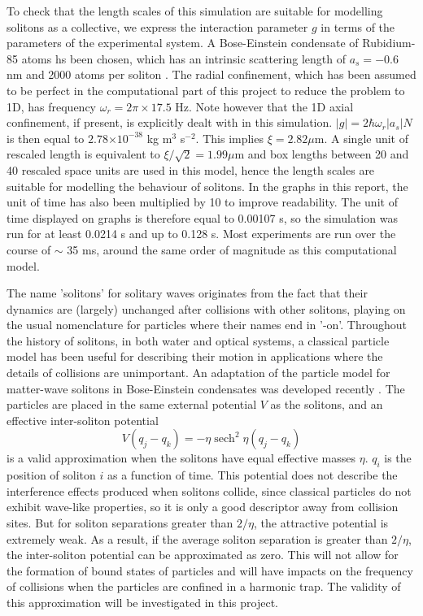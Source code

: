 \documentclass[10pt, twocolumn]{revtex4}    %
\DeclareMathOperator{\sech}{sech}		%
\providecommand{\e}[1]{\ensuremath{\times 10^{#1}}} %
\begin{document}
To check that the length scales of this simulation are suitable for modelling solitons as a collective, we express the interaction parameter $g$ in terms of the parameters of the experimental system. A Bose-Einstein condensate of Rubidium-85 atoms hs been chosen, which has an intrinsic scattering length of $a_s = -0.6$ nm and 2000 atoms per soliton \cite{ExpParams}. The radial confinement, which has been assumed to be perfect in the computational part of this project to reduce the problem to 1D, has frequency $\omega_r = 2\pi \times 17.5$ Hz. Note however that the 1D axial confinement, if present, is explicitly dealt with in this simulation. $|g| = 2\hbar \omega_r |a_s| N$ \cite{Cornish} is then equal to $2.78 \e{-38}$ kg m$^3$ s$^{-2}$. This implies $\xi = 2.82 \mu$m. A single unit of rescaled length is equivalent to $\xi/\sqrt{2} = 1.99 \mu$m and box lengths between 20 and 40 rescaled space units are used in this model, hence the length scales are suitable for modelling the behaviour of solitons. In the graphs in this report, the unit of time has also been multiplied by 10 to improve readability. The unit of time displayed on graphs is therefore equal to 0.00107 s, so the simulation was run for at least 0.0214 s and up to 0.128 s. Most experiments are run over the course of $\sim$ 35 ms, around the same order of magnitude as this computational model. 

The name 'solitons' for solitary waves originates from the fact that their dynamics are (largely) unchanged after collisions with other solitons, playing on the usual nomenclature for particles where their names end in '-on'. Throughout the history of solitons, in both water and optical systems, a classical particle model has been useful for describing their motion in applications where the details of collisions are unimportant. An adaptation of the particle model for matter-wave solitons in Bose-Einstein condensates was developed recently \cite{Martin}. The particles are placed in the same external potential $V$ as the solitons, and an effective inter-soliton potential 
\begin{equation}
V(q_j - q_k) = -\eta \sech^2{\eta(q_j - q_k)}
\end{equation}
is a valid approximation when the solitons have equal effective masses $\eta$. $q_i$ is the position of soliton $i$ as a function of time. This potential does not describe the interference effects produced when solitons collide, since classical particles do not exhibit wave-like properties, so it is only a good descriptor away from collision sites. But for soliton separations greater than $2/\eta$, the attractive potential is extremely weak. As a result, if the average soliton separation is greater than $2/\eta$, the inter-soliton potential can be approximated as zero. This will not allow for the formation of bound states of particles \cite{Bound} and will have impacts on the frequency of collisions when the particles are confined in a harmonic trap. The validity of this approximation will be investigated in this project. 
\end{document}
